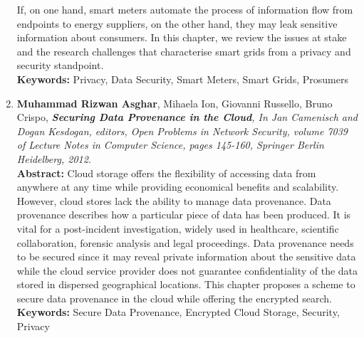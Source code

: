 \documentclass[epsfig,a4paper,11pt,titlepage]{book}
\numberwithin{algorithm}{chapter}
\begin{document}
\begin{enumerate}
	If, on one hand, smart meters automate the process of information flow from endpoints to energy suppliers, on the other hand, they may leak sensitive information about consumers. In this chapter, we review the issues at stake and the research challenges that characterise smart grids from a privacy and security standpoint. \vspace{3mm} \\
\textbf{Keywords:} Privacy, Data Security, Smart Meters, Smart Grids, Prosumers
  
	\item \textbf{Muhammad Rizwan Asghar}, Mihaela Ion, Giovanni Russello, Bruno Crispo, \textit{\textbf{Securing Data Provenance in the Cloud}, In Jan Camenisch and Dogan Kesdogan, editors, Open Problems in Network Security, volume 7039 of Lecture Notes in Computer Science, pages 145-160, Springer Berlin Heidelberg, 2012.} \vspace{3mm} \\
\textbf{Abstract:} Cloud storage offers the flexibility of accessing data from anywhere at any time while providing economical benefits and scalability. However, cloud stores lack the ability to manage data provenance. Data provenance describes how a particular piece of data has been produced. It is vital for a post-incident investigation, widely used in healthcare, scientific collaboration, forensic analysis and legal proceedings. Data provenance needs to be secured since it may reveal private information about the sensitive data while the cloud service provider does not guarantee confidentiality of the data stored in dispersed geographical locations. This chapter proposes a scheme to secure data provenance in the cloud while offering the encrypted search. \vspace{3mm} \\
\textbf{Keywords:} Secure Data Provenance, Encrypted Cloud Storage, Security, Privacy
	

\end{enumerate}
\end{document}
